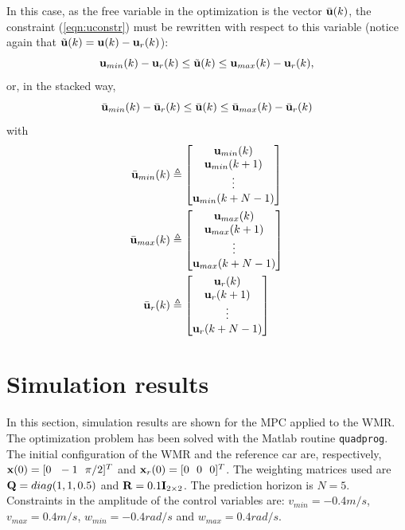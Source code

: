 \documentclass[conference]{IEEEtran} %
\begin{document}
In this case, as the free variable in the optimization is the vector $\bar{\bf u}(k)$, the constraint (\ref{eqn:uconstr}) must be rewritten with respect to this variable (notice again that $\tilde{\bf u}(k)={\bf u}(k)-{\bf u}_r(k)$):
\begin{equation*}
	{\bf u}_{min}(k) - {\bf u}_r(k) \leq \tilde{\bf u}(k) \leq {\bf u}_{max}(k) - {\bf u}_r(k),
\end{equation*}
or, in the stacked way,
\begin{equation*}
	\bar{\bf u}_{min}(k) - \bar{\bf u}_r(k) \leq \bar{\bf u}(k) \leq \bar{\bf u}_{max}(k) - \bar{\bf u}_r(k)
\end{equation*}
\noindent with
\begin{align*}
	\bar{\bf u}_{min}(k) &\triangleq \begin{bmatrix}
		{\bf u}_{min}(k) \\ {\bf u}_{min}(k+1) \\ \vdots \\ {\bf u}_{min}(k+N-1)
	\end{bmatrix} \\
	\bar{\bf u}_{max}(k) &\triangleq \begin{bmatrix}
		{\bf u}_{max}(k) \\ {\bf u}_{max}(k+1) \\ \vdots \\ {\bf u}_{max}(k+N-1)
	\end{bmatrix} \\
	\bar{\bf u}_r(k) &\triangleq \begin{bmatrix}
		{\bf u}_r(k) \\ {\bf u}_r(k+1) \\ \vdots \\ {\bf u}_r(k+N-1)
	\end{bmatrix}
\end{align*}


\section{Simulation results}
\label{sec:simulations}

In this section, simulation results are shown for the MPC applied to the WMR. The optimization problem has been solved with the {\sc Matlab} routine {\tt quadprog}. The initial configuration of the WMR and the reference car are, respectively, ${\bf x}(0)=[0~~-1~~\pi/2]^T$ and ${\bf x}_r(0)=[0~~0~~0]^T$. The weighting matrices used are ${\bf Q}=diag(1,1,0.5)$ and ${\bf R}=0.1{\bf I}_{2\times 2}$. The prediction horizon is $N=5$. Constraints in the amplitude of the control variables are: $v_{min}=-0.4 m/s$, $v_{max}=0.4 m/s$, $w_{min}=-0.4 rad/s$ and $w_{max}=0.4 rad/s$.
\end{document}
